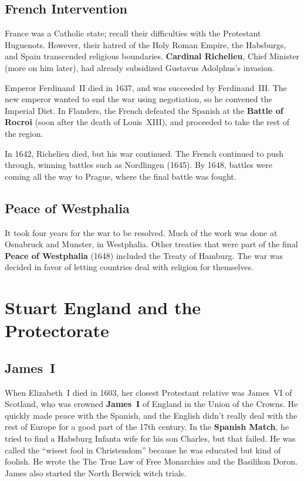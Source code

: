 \subsection*{French Intervention}

France was a Catholic state; recall their difficulties with the Protestant Huguenots.
However, their hatred of the Holy Roman Empire, the Habsburgs,
and Spain transcended religious boundaries.
\textbf{Cardinal Richelieu}, Chief Minister (more on him later),
had already subsidized Gustavus Adolphus's invasion.

Emperor Ferdinand~II died in 1637, and was succeeded by Ferdinand~III\@.
The new emperor wanted to end the war using negotiation, so he convened the Imperial Diet.
In Flanders,
the French defeated the Spanish at the \textbf{Battle of Rocroi}
(soon after the death of Louis~XIII),
and proceeded to take the rest of the region.

In 1642, Richelieu died, but his war continued.
The French continued to push through, winning battles such as Nordlingen (1645).
By 1648, battles were coming all the way to Prague, where the final battle was fought.

\subsection*{Peace of Westphalia}

It took four years for the war to be resolved.
Much of the work was done at Osnabruck and Munster, in Westphalia.
Other treaties that were part of the final \textbf{Peace of Westphalia} (1648)
included the Treaty of Hamburg.
The war was decided in favor of letting countries deal with religion for themselves.

\section{Stuart England and the Protectorate}

\subsection*{James~I}

When Elizabeth~I died in 1603, her closest Protestant relative was
James~VI of Scotland, who was crowned \textbf{James~I} of England in the Union of the Crowns.
He quickly made peace with the Spanish,
and the English didn't really deal with the rest of Europe for a good part of the 17th century.
In the \textbf{Spanish Match},
he tried to find a Habsburg Infanta wife for his son Charles, but that failed.
He was called the ``wisest fool in Christendom'' because he was educated but kind of foolish.
He wrote the The True Law of Free Monarchies and the Basilikon Doron.
James also started the North Berwick witch trials.

